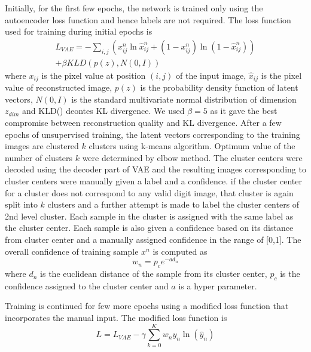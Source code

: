 \documentclass{uai2021} %
\begin{document}
Initially, for the first few epochs, the network is trained only using the autoencoder loss function and hence labels are not required.
The loss function used for training during initial epochs is
\begin{equation} \label{vae_loss_eqn}
\begin{split}
L_{VAE} = -\sum_{i, j}(x_{ij}^n \ln \hat{x}_{ij}^n
+ (1 - x_{ij}^n) \ln(1 -  \hat{x}_{ij}^n ) )\\
    +\beta KLD(p(z), N(0,I))
\end{split}
\end{equation}
where   $x_{ij}$ is the pixel value at position $(i, j)$ of the input image, $\hat{x}_{ij}$ is the pixel value of reconstructed image, $p(z)$ is the probability density function of latent vectors, $N(0,I)$ is the standard multivariate normal distribution of dimension $z_{dim}$ and KLD() deontes KL divergence.
We used $\beta = 5$ as it gave the best compromise between reconstruction quality and KL divergence.
After a few epochs of unsupervised training, the latent vectors corresponding to the training images are clustered $k$ clusters using k-means algorithm.
Optimum value of the number of clusters $k$ were determined by elbow method.
The cluster centers were decoded using the decoder part of VAE and the resulting images corresponding to cluster centers were manually given a label and a confidence.
if the cluster center for a cluster does not correspond to any valid digit image, that cluster is again split into $k$ clusters and a further attempt is made to label the cluster centers of 2nd level cluster.
Each sample in the cluster is assigned with the  same label as the cluster center.
Each sample is also given a confidence based on its distance from cluster center and  a manually assigned confidence in the range of [0,1].
The overall confidence of  training sample $x^n$ is computed as
\begin{equation}
w_n = p_ce^{-a d_n}
\end{equation}
where $d_n$ is the euclidean distance of the sample from its cluster center, $p_c$  is the confidence assigned to the cluster center and $a$ is a hyper parameter.

Training is continued for  few more epochs using a modified loss function that incorporates the manual input.
The modified loss function is
\begin{equation} \label{semi_supervised_loss}
L = L_{VAE}  - \gamma \sum_{k=0}^{K}w_{n}y_{n}\ln(\hat{y}_{n})
\end{equation}
\end{document}
